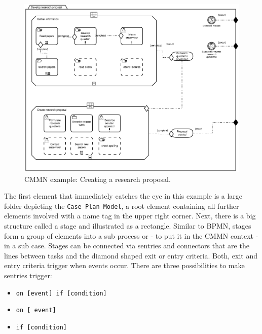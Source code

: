 \begin{figure}

	\label{fig:CMMNex}
	\centering
	\includegraphics[scale=0.5]{../figures/chapter_indicators/CMMN_Example_Proposal_Creation.png} 
		\caption{CMMN example: Creating a research proposal.}
\end{figure}

The first element that immediately catches the eye in this example is a large folder depicting the \texttt{Case Plan Model}, a root element containing all further elements involved with a name tag in the upper right corner. Next, there is a big structure called a stage and illustrated as a rectangle. Similar to BPMN, stages form a group of elements into a sub process or - to put it in the CMMN context - in a sub case. Stages can be connected via sentries and connectors that are the lines between tasks and the diamond shaped exit or entry criteria. Both, exit and entry criteria trigger when events occur. There are three possibilities to make sentries trigger:
\begin{itemize}
\item \texttt{on [event] if [condition]} 
\item \texttt{on [ event]}
\item\texttt{if  [condition]}
\end{itemize}

